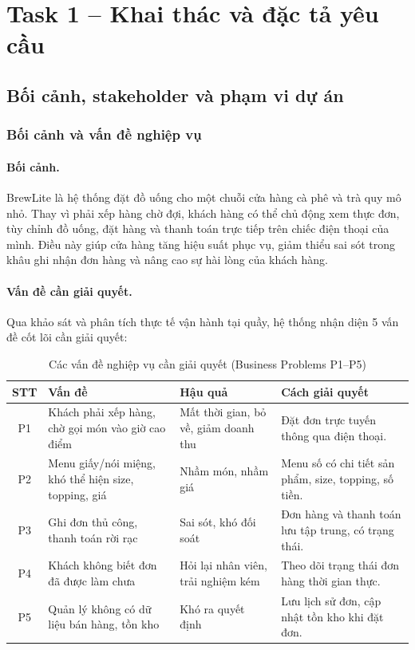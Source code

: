 ﻿%
\section{Task 1 -- Khai thác và đặc tả yêu cầu}

\subsection{Bối cảnh, stakeholder và phạm vi dự án}

\subsubsection{Bối cảnh và vấn đề nghiệp vụ}

\paragraph{Bối cảnh.}
BrewLite là hệ thống đặt đồ uống cho một chuỗi cửa hàng cà phê và trà quy mô nhỏ. Thay vì phải xếp hàng chờ đợi, khách hàng có thể chủ động xem thực đơn, tùy chỉnh đồ uống, đặt hàng và thanh toán trực tiếp trên chiếc điện thoại của mình. Điều này giúp cửa hàng tăng hiệu suất phục vụ, giảm thiểu sai sót trong khâu ghi nhận đơn hàng và nâng cao sự hài lòng của khách hàng.

\paragraph{Vấn đề cần giải quyết.}
Qua khảo sát và phân tích thực tế vận hành tại quầy, hệ thống nhận diện 5 vấn đề cốt lõi cần giải quyết:

\begin{table}[H]
\centering\small
\caption{Các vấn đề nghiệp vụ cần giải quyết (Business Problems P1--P5)}
\label{tab:business-problems}
\begin{tabularx}{\textwidth}{@{}c p{3.6cm} p{3.8cm} X@{}}
\toprule
\textbf{STT} & \textbf{Vấn đề} & \textbf{Hậu quả} & \textbf{Cách giải quyết} \\
\midrule
P1 & Khách phải xếp hàng, chờ gọi món vào giờ cao điểm & Mất thời gian, bỏ về, giảm doanh thu & Đặt đơn trực tuyến thông qua điện thoại. \\
P2 & Menu giấy/nói miệng, khó thể hiện size, topping, giá & Nhầm món, nhầm giá & Menu số có chi tiết sản phẩm, size, topping, số tiền. \\
P3 & Ghi đơn thủ công, thanh toán rời rạc & Sai sót, khó đối soát & Đơn hàng và thanh toán lưu tập trung, có trạng thái. \\
P4 & Khách không biết đơn đã được làm chưa & Hỏi lại nhân viên, trải nghiệm kém & Theo dõi trạng thái đơn hàng thời gian thực. \\
P5 & Quản lý không có dữ liệu bán hàng, tồn kho & Khó ra quyết định & Lưu lịch sử đơn, cập nhật tồn kho khi đặt đơn. \\
\bottomrule
\end{tabularx}
\end{table}

